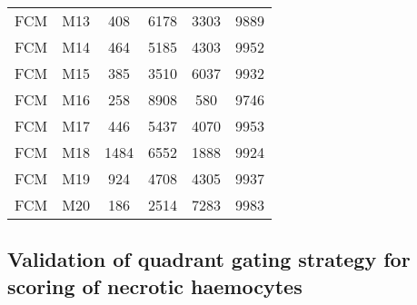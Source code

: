 \begin{center}
\begin{longtable}{cccccc}
FCM	&	M13	&	408	&	6178	&	3303	&	9889	\\
FCM	&	M14	&	464	&	5185	&	4303	&	9952	\\
FCM	&	M15	&	385	&	3510	&	6037	&	9932	\\
FCM	&	M16	&	258	&	8908	&	580	&	9746	\\
FCM	&	M17	&	446	&	5437	&	4070	&	9953	\\
FCM	&	M18	&	1484	&	6552	&	1888	&	9924	\\
FCM	&	M19	&	924	&	4708	&	4305	&	9937	\\
FCM	&	M20	&	186	&	2514	&	7283	&	9983	\\
\end{longtable}    
\end{center}




\subsection{Validation of quadrant gating strategy for scoring of necrotic haemocytes}

